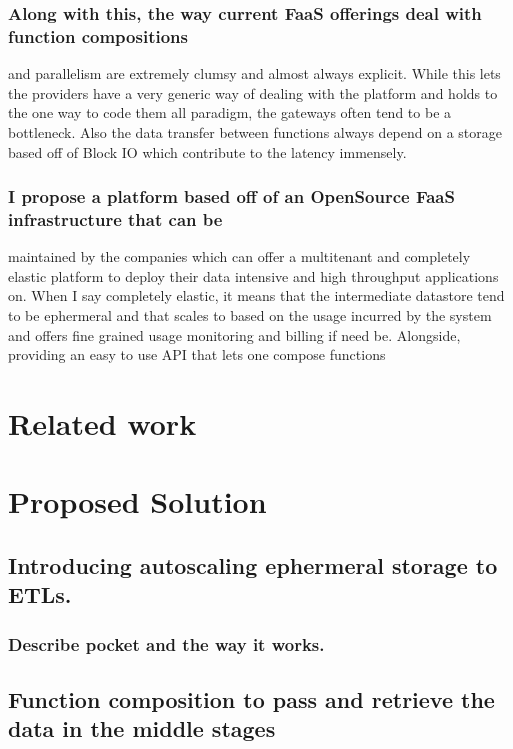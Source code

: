 \documentclass[12pt]{article}
\begin{document}
\subsubsection{Along with this, the way current FaaS offerings deal with function compositions}
\label{sec:org1fffb04}
and parallelism are extremely clumsy and almost always explicit. While this lets
the providers have a very generic way of dealing with the platform and holds to
the one way to code them all paradigm, the gateways often tend to be a
bottleneck. Also the data transfer between functions always depend on a storage
based off of Block IO which contribute to the latency immensely.
\subsubsection{I propose a platform based off of an OpenSource FaaS infrastructure that can be}
\label{sec:orgabae57e}
maintained by the companies which can offer a multitenant and completely elastic
platform to deploy their data intensive and high throughput applications on.
When I say completely elastic, it means that the intermediate datastore tend to
be ephermeral and that scales to based on the usage incurred by the system and
offers fine grained usage monitoring and billing if need be. Alongside,
providing an easy to use API that lets one compose functions 




\section{Related work}
\label{sec:org7324a48}
\section{Proposed Solution}
\label{sec:orgc205c0e}
\subsection{Introducing autoscaling ephermeral storage to ETLs.}
\label{sec:orge649c63}
\subsubsection{Describe pocket and the way it works.}
\label{sec:org2adc78a}
\subsection{Function composition to pass and retrieve the data in the middle stages}
\label{sec:orgb85fb68}
\end{document}
